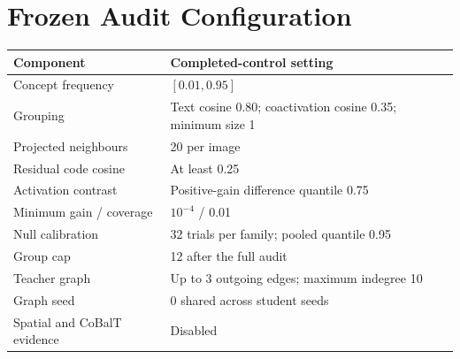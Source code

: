 \documentclass{article}
\begin{document}
\clearpage
\appendix
\section{Frozen Audit Configuration}
\begin{table}[ht]
\centering
\begin{tabularx}{\linewidth}{lX}
\toprule
Component & Completed-control setting \\
\midrule
Concept frequency & $[0.01,0.95]$ \\
Grouping & Text cosine 0.80; coactivation cosine 0.35; minimum size 1 \\
Projected neighbours & 20 per image \\
Residual code cosine & At least 0.25 \\
Activation contrast & Positive-gain difference quantile 0.75 \\
Minimum gain / coverage & $10^{-4}$ / 0.01 \\
Null calibration & 32 trials per family; pooled quantile 0.95 \\
Group cap & 12 after the full audit \\
Teacher graph & Up to 3 outgoing edges; maximum indegree 10 \\
Graph seed & 0 shared across student seeds \\
Spatial and CoBalT evidence & Disabled \\
\bottomrule
\end{tabularx}
\end{table}
\end{document}
